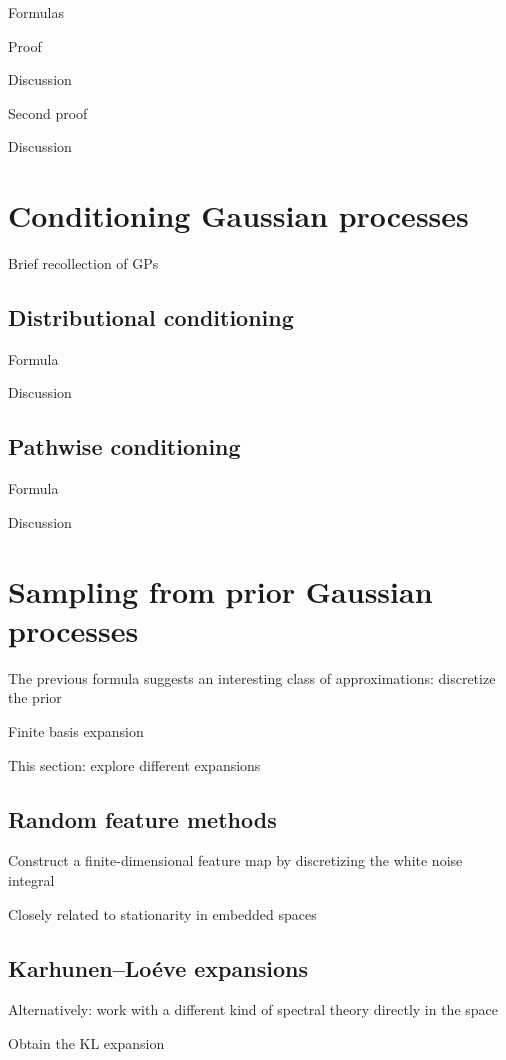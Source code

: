 \documentclass[11pt]{book}
\begin{document}
Formulas

Proof

Discussion

Second proof

Discussion

\section{Conditioning Gaussian processes}

Brief recollection of GPs 

\subsection{Distributional conditioning}

Formula

Discussion

\subsection{Pathwise conditioning}

Formula

Discussion

\section{Sampling from prior Gaussian processes}

The previous formula suggests an interesting class of approximations: discretize the prior

Finite basis expansion

This section: explore different expansions

\subsection{Random feature methods}

Construct a finite-dimensional feature map by discretizing the white noise integral

Closely related to stationarity in embedded spaces

\subsection{Karhunen--Loéve expansions}

Alternatively: work with a different kind of spectral theory directly in the space

Obtain the KL expansion
\end{document}
